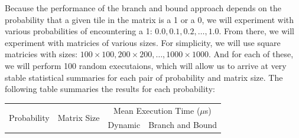 \documentclass{article}
\begin{document}
Because the performance of the branch and bound approach depends on the probability that a given tile in the matrix is a 1 or a 0, we will experiment with various probabilities of encountering a 1: $0.0, 0.1, 0.2, \hdots, 1.0$.
From there, we will experiment with matricies of various sizes.
For simplicity, we will use square matricies with sizes: $100\times100, 200\times200, \hdots, 1000\times1000$.
And for each of these, we will perform 100 random executaions, which will allow us to arrive at very stable statistical summaries for each pair of probability and matrix size.
The following table summaries the results for each probability:

\FloatBarrier
\begin{longtable}{|c|c|r|r|}
\hline
\multirow{2}{*}{Probability} & \multirow{2}{*}{Matrix Size} & \multicolumn{2}{|c|}{Mean Execution Time ($\mu$s)}\\
\cline{3-4}
&&Dynamic&Branch and Bound\\
\hline


\end{longtable}
\end{document}
